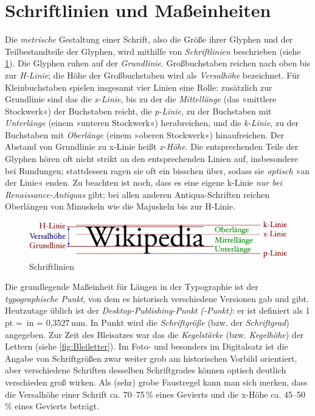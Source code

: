 \section{Schriftlinien und Maßeinheiten}
\label{sec:Linien}

Die \emph{metrische} Gestaltung einer Schrift, also die Größe ihrer
Glyphen und der Teilbestandteile der Glyphen, wird mithilfe von
\emph{Schriftlinien} beschrieben (siehe \cref{fig:Liniensystem}).  Die
Glyphen ruhen auf der \emph{Grundlinie}.  Großbuchstaben reichen nach
oben bis zur \emph{H-Linie}; die Höhe der Großbuchstaben wird als
\emph{Versalhöhe} bezeichnet.  Für Kleinbuchstaben spielen insgesamt
vier Linien eine Rolle: zusätzlich zur Grundlinie sind das die
\emph{x-Linie}, bis zu der die \emph{Mittellänge} (das »mittlere
Stockwerk«) der Buchstaben reicht, die \emph{p-Linie}, zu der
Buchstaben mit \emph{Unterlänge} (einem »unteren Stockwerk«)
herabreichen, und die \emph{k-Linie}, zu der Buchstaben mit
\emph{Oberlänge} (einem »oberen Stockwerk«) hinaufreichen.  Der
Abstand von Grundlinie zu x-Linie heißt \emph{x-Höhe}.  Die
entsprechenden Teile der Glyphen hören oft nicht strikt an den
entsprechenden Linien auf, insbesondere bei Rundungen; stattdessen
ragen sie oft ein bisschen über, sodass sie \emph{optisch} »an der
Linie« enden.  Zu beachten ist noch, dass es eine eigene k-Linie
\emph{nur bei Renaissance-Antiquas} gibt; bei allen anderen
Antiqua-Schriften reichen Oberlängen von Minuskeln wie die Majuskeln
bis zur \mbox{H-Linie}.

\begin{figure}
  \centering
  \includegraphics[width=\textwidth]{Liniensystem}
  \caption{Schriftlinien\protect\footnotemark}
  \label{fig:Liniensystem}
\end{figure}

Die grundlegende Maßeinheit für Längen in der Typographie ist der
\emph{typographische Punkt}, von dem es historisch verschiedene
Versionen gab und gibt.  Heutzutage üblich ist der
\emph{Desktop-Publishing-Punkt} \emph{(-Punkt)}: er ist
definiert als 1\,pt = \,in =
0,352$\overline{\text{7}}$\,mm.  In Punkt wird die \emph{Schriftgröße}
(bzw. der \emph{Schriftgrad}) angegeben.  Zur Zeit des Bleisatzes war
das die \emph{Kegelstärke} (bzw. \emph{Kegelhöhe}) der Lettern (siehe
\cref{fig:Bleiletter}).  Im Foto- und besonders im Digitalsatz ist die
Angabe von Schriftgrößen zwar weiter grob am historischen Vorbild
orientiert, aber verschiedene Schriften desselben Schriftgrades können
optisch deutlich verschieden groß wirken.  Als (sehr) grobe Faustregel
kann man sich merken, dass die Versalhöhe einer Schrift ca. 70--75\,\%
eines Gevierts und die x-Höhe ca. 45--50\,\% eines Gevierts beträgt.

